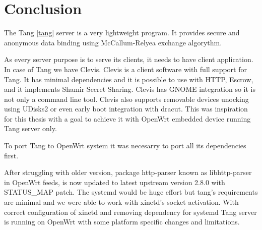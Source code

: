 \chapter{Conclusion}\label{conlusion}



The Tang \ref{tang} server is a very lightweight program.
It provides secure and anonymous data binding using McCallum-Relyea exchange algorythm.

As every server purpose is to serve its clients, it needs to have client application.
In case of Tang we have Clevis.
Clevis is a client software with full support for Tang.
It has minimal dependencies and it is possible to use with HTTP, Escrow, and it implements Shamir Secret Sharing.
Clevis has GNOME integration so it is not only a command line tool.
Clevis also supports removable devices unocking using UDisks2 or even early boot integration with dracut.
This was inspiration for this thesis with a goal to achieve it with OpenWrt embedded device running Tang server only.

To port Tang to OpenWrt system it was necesarry to port all its dependencies first.

After struggling with older version, package http-parser known as libhttp-parser in OpenWrt feeds, is now updated to latest upstream version 2.8.0 with STATUS\_MAP patch.
The systemd would be huge effort but tang's requirements are minimal and we were able to work with xinetd's socket activation.
With correct configuration of xinetd and removing dependency for systemd Tang server is running on OpenWrt with some platform specific changes and limitations.
